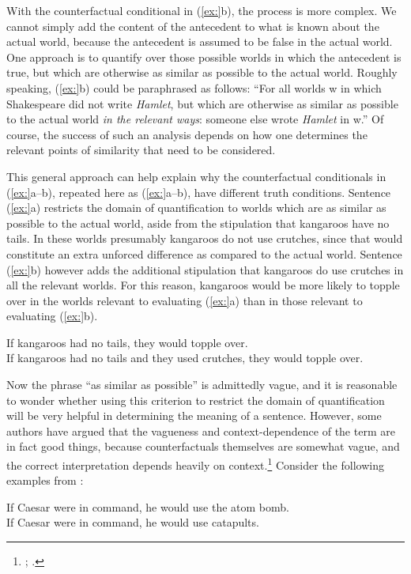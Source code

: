 With the counterfactual conditional in (\ref{ex:}b), the process is more complex. We cannot simply add the content of the antecedent to what is known about the actual world, because the antecedent is assumed to be false in the actual world. One approach is to quantify over those possible worlds in which the antecedent is true, but which are otherwise as similar as possible to the actual world. Roughly speaking, (\ref{ex:}b) could be paraphrased as follows: “For all worlds w in which Shakespeare did not write \textit{Hamlet}, but which are otherwise as similar as possible to the actual world \textit{in the relevant ways}: someone else wrote \textit{Hamlet} in w.” Of course, the success of such an analysis depends on how one determines the relevant points of similarity that need to be considered.



This general approach can help explain why the counterfactual conditionals in (\ref{ex:}a--b), repeated here as (\ref{ex:}a--b), have different truth conditions. Sentence (\ref{ex:}a) restricts the domain of quantification to worlds which are as similar as possible to the actual world, aside from the stipulation that kangaroos have no tails. In these worlds presumably kangaroos do not use crutches, since that would constitute an extra unforced difference as compared to the actual world. Sentence (\ref{ex:}b) however adds the additional stipulation that kangaroos do use crutches in all the relevant worlds. For this reason, kangaroos would be more likely to topple over in the worlds relevant to evaluating (\ref{ex:}a) than in those relevant to evaluating (\ref{ex:}b).


\ea
\ea If kangaroos had no tails, they would topple over.\\
\ex If kangaroos had no tails and they used crutches, they would topple over.
                       \z
\z


Now the phrase “as similar as possible” is admittedly vague, and it is reasonable to wonder whether using this criterion to restrict the domain of quantification will be very helpful in determining the meaning of a sentence. However, some authors have argued that the vagueness and context-dependence of the term are in fact good things, because counterfactuals themselves are somewhat vague, and the correct interpretation depends heavily on context.\footnote{\citet[91ff]{Lewis1973a}; \citet{vonFintel2012}.} Consider the following examples from \citet[221]{Quine1960}:


\ea
\ea If Caesar were in command, he would use the atom bomb.\\
\ex If Caesar were in command, he would use catapults.
                       \z
\z


